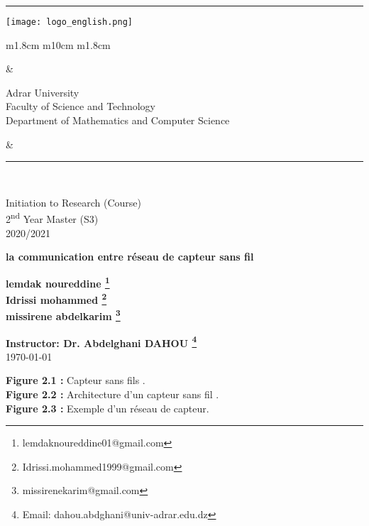 \documentclass[paper=a4, fontsize=11pt]{scrartcl}
\numberwithin{equation}{section}		%
\numberwithin{figure}{section}			%
\numberwithin{table}{section}				%
\newcommand{\horrule}[1]{\rule{\linewidth}{#1}} 	%
\begin{document}
		
{\flushleft\horrule{2pt}
\begin{center}
{\texttt{[image: logo\_english.png]}} 
\begin{tabular}{ m{1.8cm} m{10cm} m{1.8cm}}
\begin{center}
\end{center}
&
\begin{center} 
{\small
{Adrar University} \\
{Faculty of Science and Technology} \\
{Department of Mathematics and Computer Science}} \\

\end{center}
&

\begin{center}
\end{center}
\end{tabular}
\end{center}
\flushleft \horrule{2pt}\\[1cm]
}


\begin{center}

{
\huge  
Initiation to Research (Course) \\
\vspace{0.2cm}
2\textsuperscript{nd} Year Master (S3) \\
\vspace{0.2cm}
2020/2021}\\

\vspace{1cm}

{
\Huge   
\textbf{la communication entre réseau de capteur sans fil  }}\\
\vspace{1cm}

{
\Large
\textbf{lemdak noureddine \footnote{lemdaknoureddine01@gmail.com} \\Idrissi mohammed \footnote{Idrissi.mohammed1999@gmail.com} \\ missirene abdelkarim \footnote{missirenekarim@gmail.com}}}\\
\vspace{3cm}

{
\large
\textbf{Instructor: Dr. Abdelghani DAHOU \footnote{Email: dahou.abdghani@univ-adrar.edu.dz}}}\\
\today
\end{center}
\pagebreak
\tableofcontents
\pagebreak
\listoffigures
\textbf{Figure 2.1 :} Capteur sans fils .\\
\textbf{Figure 2.2 :} Architecture d'un capteur sans fil .\\
\textbf{Figure 2.3 :} Exemple d’un réseau de capteur.\\
\pagebreak
\end{document}
